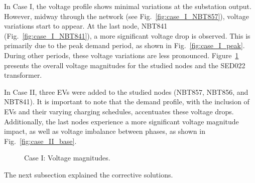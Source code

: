 \documentclass[12pt, 3p]{elsarticle}
\begin{document}
In Case I, the voltage profile shows minimal variations at 
the substation output. However, midway through the network 
(see Fig.~\ref{fig:case_I_NBT857}), voltage variations start 
to appear. At the last node, NBT841 (Fig.~\ref{fig:case_I_NBT841}), 
a more significant voltage drop is observed. This is primarily due 
to the peak demand period, as shown in Fig.~\ref{fig:case_I_peak}. 
During other periods, these voltage variations are less pronounced. 
Figure~\ref{fig:case_I_base} presents the overall voltage 
magnitudes for the studied nodes and the SED022 transformer.

In Case II, three EVs were added to the studied nodes 
(NBT857, NBT856, and NBT841). It is important to note 
that the demand profile, with the inclusion of EVs and 
their varying charging schedules, accentuates these 
voltage drops. Additionally, the last nodes experience a 
more significant voltage magnitude impact, as well as 
voltage imbalance between phases, as shown in 
Fig.~\ref{fig:case_II_base}.


\begin{figure}[!ht]
    \centering
    \caption{Case I: Voltage magnitudes.}
    \label{fig:case_I_base}
\end{figure}


The next subsection explained the corrective solutions.
\end{document}

